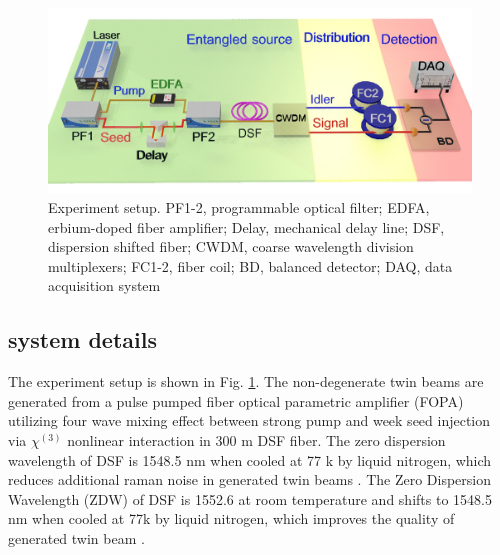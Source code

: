 \documentclass[9pt,twocolumn,twoside]{osajnl}
\begin{document}
\begin{figure}[htbp]
\centering
    \includegraphics[width=\linewidth]{fig1_3d_2.jpg}
\caption{Experiment setup.
PF1-2, programmable optical filter;
EDFA, erbium-doped fiber amplifier;
Delay, mechanical delay line;
DSF, dispersion shifted fiber;
CWDM, coarse wavelength division multiplexers;
FC1-2, fiber coil;
BD, balanced detector;
DAQ, data acquisition system}
\label{fig_setup}

\end{figure}

\subsection{system details}
The experiment setup is shown in Fig. \ref{fig_setup}.
The non-degenerate twin beams are generated from a pulse pumped fiber optical parametric amplifier (FOPA) utilizing four wave mixing effect between strong pump and week seed injection via \(\chi^{(3)} \) nonlinear interaction in 300 m DSF fiber.
The zero dispersion wavelength of DSF is 1548.5 nm when cooled at 77 k by liquid nitrogen, which reduces additional raman noise in generated twin beams \cite{guo12}.
The Zero Dispersion Wavelength (ZDW) of DSF is 1552.6 at room temperature and shifts to 1548.5 nm when cooled at 77k by liquid nitrogen, which improves the quality of generated twin beam \cite{guo12}.
\end{document}
